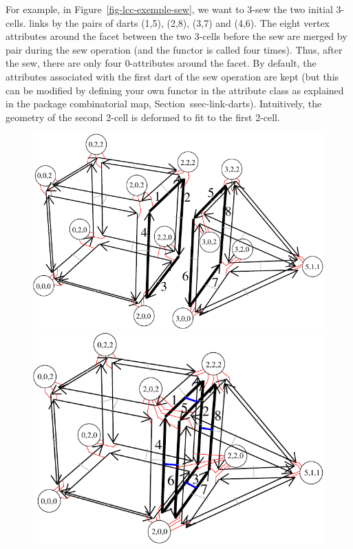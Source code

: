 For example, in Figure~\ref{fig-lcc-exemple-sew}, we want to 3-sew the
two initial 3-cells.  links by \betatrois{} the pairs
of darts (1,5), (2,8), (3,7) and (4,6). The eight vertex attributes
around the facet between the two 3-cells before the sew are merged by
pair during the sew operation (and the  functor is
called four times). Thus, after the sew, there are only four
0-attributes around the facet. By default, the attributes associated
with the first dart of the sew operation are kept (but this can be
modified by defining your own functor in the attribute class as
explained in the package combinatorial map, Section~{ssec-link-darts}). 
Intuitively, the
geometry of the second 2-cell is deformed to fit to the first 2-cell.
%
\def\LargFig{.45\textwidth}
\begin{figure}
  \begin{ccTexOnly}
    \begin{center}
      \includegraphics[width=\LargFig]{Linear_cell_complex/fig/pdf/exemple-carte-with_point_3d-sew}\qquad
      \includegraphics[width=\LargFig]{Linear_cell_complex/fig/pdf/exemple-carte-with_point_3d-sew2}

\end{center}
\end{ccTexOnly}
\end{figure}
